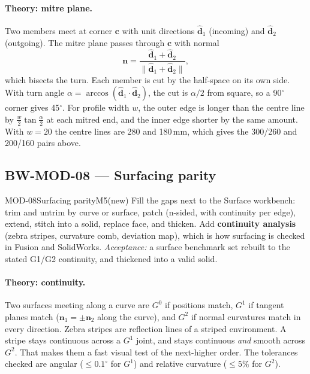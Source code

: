 \paragraph{Theory: mitre plane.} Two members meet at corner $\mathbf c$ with unit directions
$\hat{\mathbf d}_1$ (incoming) and $\hat{\mathbf d}_2$ (outgoing). The mitre plane passes through $\mathbf c$
with normal
\[
  \mathbf n=\frac{\hat{\mathbf d}_1+\hat{\mathbf d}_2}{\lVert\hat{\mathbf d}_1+\hat{\mathbf d}_2\rVert},
\]
which bisects the turn. Each member is cut by the half-space on its own side. With turn angle
$\alpha=\arccos(\hat{\mathbf d}_1\!\cdot\hat{\mathbf d}_2)$, the cut is $\alpha/2$ from square, so a
90$^\circ$ corner gives 45$^\circ$. For profile width $w$, the outer edge is longer than the centre line by
$\tfrac{w}{2}\tan\tfrac{\alpha}{2}$ at each mitred end, and the inner edge shorter by the same amount. With
$w=20$ the centre lines are 280 and 180\,mm, which gives the 300/260 and 200/160 pairs above.



\subsection{BW-MOD-08 --- Surfacing parity}

\begin{epic}{MOD-08}{Surfacing parity}{M5}{\stTodo}{(new)}
Fill the gaps next to the Surface workbench: trim and untrim by curve or surface, patch (n-sided, with
continuity per edge), extend, stitch into a solid, replace face, and thicken. Add \textbf{continuity
analysis} (zebra stripes, curvature comb, deviation map), which is how surfacing is checked in Fusion and
SolidWorks.
\emph{Acceptance:} a surface benchmark set rebuilt to the stated G1/G2 continuity, and thickened into a
valid solid.
\end{epic}

\paragraph{Theory: continuity.} Two surfaces meeting along a curve are $G^0$ if positions match, $G^1$ if
tangent planes match ($\mathbf n_1=\pm\mathbf n_2$ along the curve), and $G^2$ if normal curvatures match in
every direction. Zebra stripes are reflection lines of a striped environment. A stripe stays continuous
across a $G^1$ joint, and stays continuous \emph{and} smooth across $G^2$. That makes them a fast visual test
of the next-higher order. The tolerances checked are angular ($\le0.1^\circ$ for $G^1$) and relative curvature
($\le5\%$ for $G^2$).

